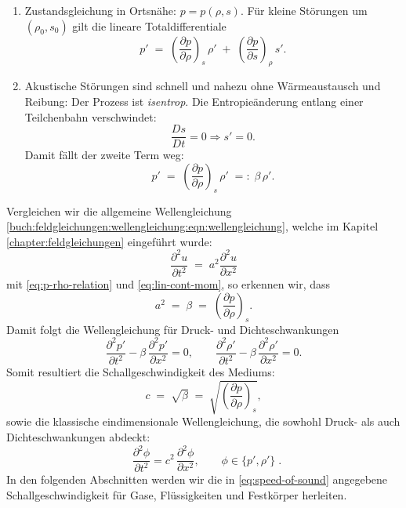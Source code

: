 \begin{enumerate}
\item Zustandsgleichung in Ortsnähe: $p=p(\rho,s)$.
      Für kleine Störungen um $(\rho_0,s_0)$ gilt die lineare Totaldifferentiale
      \[
        p' \;=\; \left(\frac{\partial p}{\partial \rho}\right)_{s}\,\rho'
             \;+\; \left(\frac{\partial p}{\partial s}\right)_{\rho}\,s'.
      \]
\item Akustische Störungen sind schnell und nahezu ohne Wärmeaustausch
      und Reibung: Der Prozess ist \emph{isentrop}.
      Die Entropieänderung entlang einer Teilchenbahn verschwindet:
      \[
        \frac{Ds}{Dt}=0
        \Rightarrow s'=0.
      \]
      Damit fällt der zweite Term weg:
      \begin{equation}
        p' \;=\; \left(\frac{\partial p}{\partial \rho}\right)_{s}\,\rho' \;=:\; \beta\,\rho'.
        \label{eq:p-rho-relation}
      \end{equation}
\end{enumerate}
Vergleichen wir die allgemeine Wellengleichung \eqref{buch:feldgleichungen:wellengleichung:eqn:wellengleichung},
welche im Kapitel \ref{chapter:feldgleichungen} eingeführt wurde:
\[
    \frac{\partial^2 u}{\partial t^2} \;=\;a^2 \frac{\partial^2 u}{\partial x^2}
\]
mit \eqref{eq:p-rho-relation} und \eqref{eq:lin-cont-mom}, so erkennen wir, dass
\[    a^2 \;=\; \beta \;=\; \left(\frac{\partial p}{\partial \rho}\right)_{s}.\]
Damit folgt die Wellengleichung für Druck- und Dichteschwankungen
\begin{equation}
    \frac{\partial^2 p'}{\partial t^2} - \beta\,\frac{\partial^2 p'}{\partial x^2} = 0,
    \qquad
    \frac{\partial^2 \rho'}{\partial t^2} - \beta\,\frac{\partial^2 \rho'}{\partial x^2} = 0.
    \label{eq:wave-equation-p-rho}
\end{equation}
Somit resultiert die Schallgeschwindigkeit des Mediums:
\begin{equation}
    c \;=\; \sqrt{\beta} \;=\; \sqrt{\left(\frac{\partial p}{\partial \rho}\right)_{s}},
    \label{eq:speed-of-sound}
\end{equation}
sowie die klassische eindimensionale Wellengleichung, die sowhohl
Druck- als auch Dichteschwankungen abdeckt:
\begin{equation}
    \;\;\frac{\partial^2 \phi}{\partial t^2} = c^2\,
    \frac{\partial^2 \phi}{\partial x^2}, \qquad \phi\in\{p',\rho'\}\; .
    \label{eq:1d-wave-equation}
\end{equation}
In den folgenden Abschnitten werden wir die in \eqref{eq:speed-of-sound}
angegebene Schallgeschwindigkeit für Gase, Flüssigkeiten und Festkörper
herleiten.

